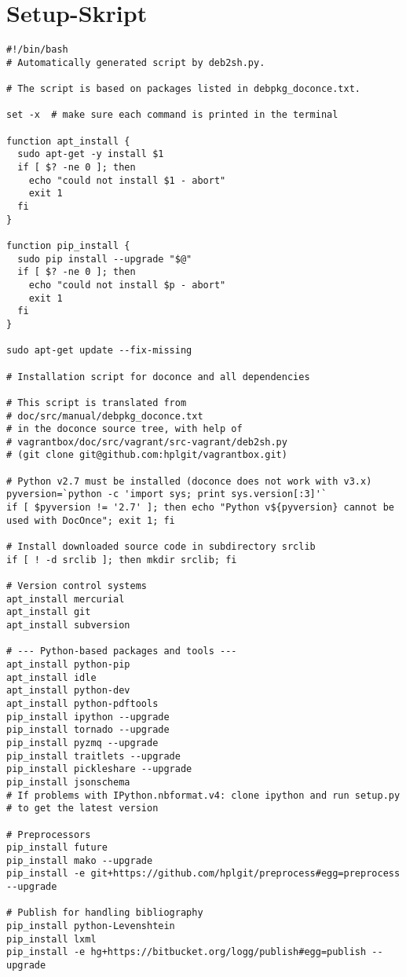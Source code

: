 \documentclass[%
oneside,                 %
final,                   %
chapterprefix=true,      %
open=right,              %
10pt]{book}
\begin{document}
\section{Setup-Skript}
\begin{verbatim}
#!/bin/bash
# Automatically generated script by deb2sh.py.

# The script is based on packages listed in debpkg_doconce.txt.

set -x  # make sure each command is printed in the terminal

function apt_install {
  sudo apt-get -y install $1
  if [ $? -ne 0 ]; then
    echo "could not install $1 - abort"
    exit 1
  fi
}

function pip_install {
  sudo pip install --upgrade "$@"
  if [ $? -ne 0 ]; then
    echo "could not install $p - abort"
    exit 1
  fi
}

sudo apt-get update --fix-missing

# Installation script for doconce and all dependencies

# This script is translated from
# doc/src/manual/debpkg_doconce.txt
# in the doconce source tree, with help of
# vagrantbox/doc/src/vagrant/src-vagrant/deb2sh.py
# (git clone git@github.com:hplgit/vagrantbox.git)

# Python v2.7 must be installed (doconce does not work with v3.x)
pyversion=`python -c 'import sys; print sys.version[:3]'`
if [ $pyversion != '2.7' ]; then echo "Python v${pyversion} cannot be used with DocOnce"; exit 1; fi

# Install downloaded source code in subdirectory srclib
if [ ! -d srclib ]; then mkdir srclib; fi

# Version control systems
apt_install mercurial
apt_install git
apt_install subversion

# --- Python-based packages and tools ---
apt_install python-pip
apt_install idle
apt_install python-dev
apt_install python-pdftools
pip_install ipython --upgrade
pip_install tornado --upgrade
pip_install pyzmq --upgrade
pip_install traitlets --upgrade
pip_install pickleshare --upgrade
pip_install jsonschema
# If problems with IPython.nbformat.v4: clone ipython and run setup.py
# to get the latest version

# Preprocessors
pip_install future
pip_install mako --upgrade
pip_install -e git+https://github.com/hplgit/preprocess#egg=preprocess --upgrade

# Publish for handling bibliography
pip_install python-Levenshtein
pip_install lxml
pip_install -e hg+https://bitbucket.org/logg/publish#egg=publish --upgrade


\end{verbatim}
\end{document}
